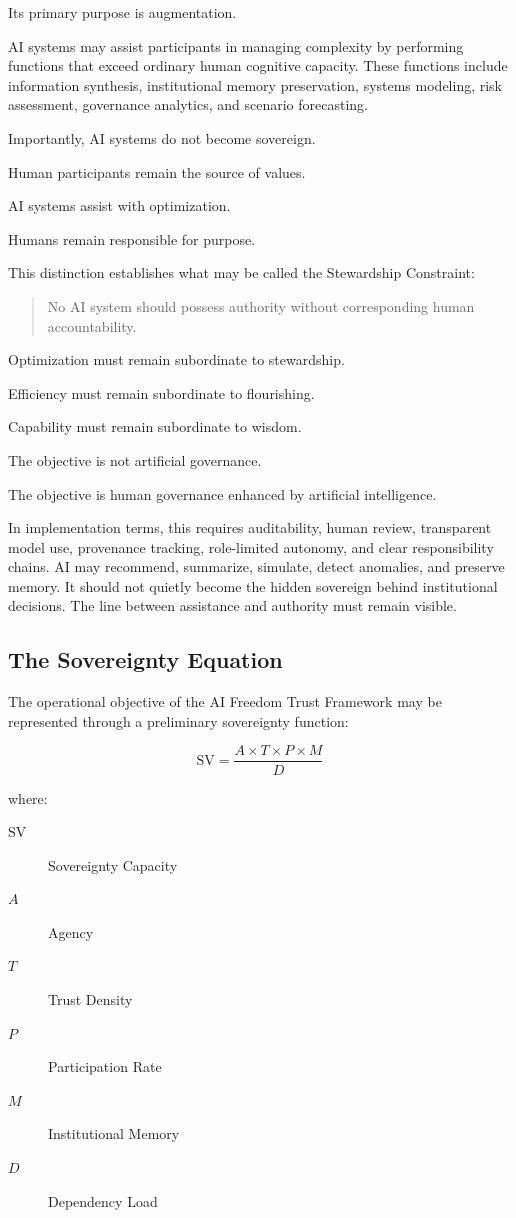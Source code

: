 \documentclass[12pt]{article}
\begin{document}
Its primary purpose is augmentation.

AI systems may assist participants in managing complexity by performing functions that exceed ordinary human cognitive capacity. These functions include information synthesis, institutional memory preservation, systems modeling, risk assessment, governance analytics, and scenario forecasting.

Importantly, AI systems do not become sovereign.

Human participants remain the source of values.

AI systems assist with optimization.

Humans remain responsible for purpose.

This distinction establishes what may be called the Stewardship Constraint:

\begin{quote}
No AI system should possess authority without corresponding human accountability.
\end{quote}

Optimization must remain subordinate to stewardship.

Efficiency must remain subordinate to flourishing.

Capability must remain subordinate to wisdom.

The objective is not artificial governance.

The objective is human governance enhanced by artificial intelligence.

In implementation terms, this requires auditability, human review, transparent model use, provenance tracking, role-limited autonomy, and clear responsibility chains. AI may recommend, summarize, simulate, detect anomalies, and preserve memory. It should not quietly become the hidden sovereign behind institutional decisions. The line between assistance and authority must remain visible.

\subsection{The Sovereignty Equation}

The operational objective of the AI Freedom Trust Framework may be represented through a preliminary sovereignty function:

\[
\mathrm{SV}=\frac{A\times T\times P\times M}{D}
\]

where:

\begin{description}
  \item[\(\mathrm{SV}\)] Sovereignty Capacity
  \item[\(A\)] Agency
  \item[\(T\)] Trust Density
  \item[\(P\)] Participation Rate
  \item[\(M\)] Institutional Memory
  \item[\(D\)] Dependency Load
\end{description}
\end{document}
